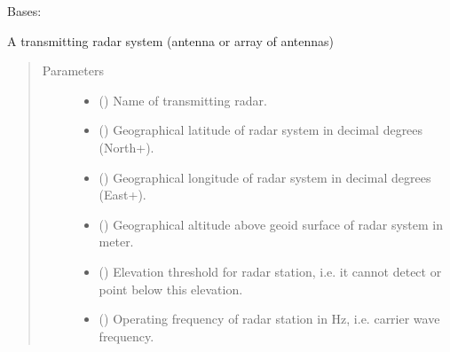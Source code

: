 \documentclass[letterpaper,10pt,english]{sphinxmanual}
\begin{document}
\begin{fulllineitems}
\label{\detokenize{modules/antenna:antenna.AntennaTX}}
Bases: {\hyperref[\detokenize{modules/antenna:antenna.AntennaRX}]{}}

A transmitting radar system (antenna or array of antennas)
\begin{quote}\begin{description}
\item[{Parameters}] \leavevmode\begin{itemize}
\item {} 
 () \textendash{} Name of transmitting radar.

\item {} 
 () \textendash{} Geographical latitude of radar system in decimal degrees (North+).

\item {} 
 () \textendash{} Geographical longitude of radar system in decimal degrees (East+).

\item {} 
 () \textendash{} Geographical altitude above geoid surface of radar system in meter.

\item {} 
 () \textendash{} Elevation threshold for radar station, i.e. it cannot detect or point below this elevation.

\item {} 
 () \textendash{} Operating frequency of radar station in Hz, i.e. carrier wave frequency.


\end{itemize}
\end{description}
\end{quote}
\end{fulllineitems}
\end{document}
